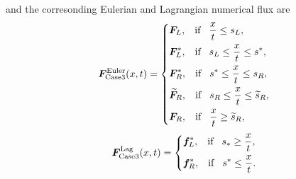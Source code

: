 \documentclass{article}
\numberwithin{equation}{section}
\numberwithin{table}{section}
\begin{document}
  and the corresonding Eulerian and Lagrangian numerical flux are
 \begin{equation}\label{eq:HLLCEP3}
   \bm{F}^{\text{Euler}}_{\text{Case3}}(x,t) = \left\{ \begin{aligned}
		& \bm{F}_L, \hspace{0.3cm} \text{if} \hspace{0.3cm} \frac{x}{t}\le s_L, \\
		& \bm{F}_L^*, \hspace{0.3cm} \text{if} \hspace{0.3cm} s_L\le \frac{x}{t} \le s^*, \\
		& \bm{F}_R^*, \hspace{0.3cm} \text{if} \hspace{0.3cm} s^*\le \frac{x}{t} \le s_R, \\
		&  \widetilde{\bm{F}}_R, \hspace{0.3cm} \text{if} \hspace{0.3cm} s_R\le \frac{x}{t} \le \widetilde{s}_R,\\
		& \bm{F}_R, \hspace{0.3cm} \text{if} \hspace{0.3cm} \frac{x}{t}\ge \widetilde{s}_R, \\
	  \end{aligned}
	\right.
  \end{equation}
\begin{equation}
	\bm{F}^{\text{Lag}}_{\text{Case3}}(x,t) = \left\{ \begin{aligned}
		& \bm{f}_L^*, \hspace{0.3cm} \text{if} \hspace{0.3cm} s_*\ge \frac{x}{t},\\
		& \bm{f}_R^*, \hspace{0.3cm} \text{if} \hspace{0.3cm} s^*\le \frac{x}{t}.\\
	  \end{aligned}
	\right.
  \end{equation}
\end{document}
